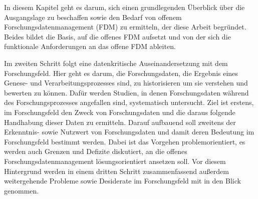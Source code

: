 \onehalfspacing

In diesem Kapitel geht es darum, sich einen grundlegenden Überblick über die Ausgangslage zu beschaffen sowie den Bedarf von offenem Forschungsdatenmanagement (FDM) zu ermitteln, der diese Arbeit begründet. Beides bildet die Basis, auf die offenes FDM aufsetzt und von der sich die funktionale Anforderungen an das offene FDM ableiten. 

Im zweiten Schritt folgt eine datenkritische Auseinandersetzung mit dem Forschungsfeld. Hier geht es darum, die Forschungsdaten, die Ergebnis eines Genese- und Verarbeitungsprozesses sind, zu historisieren um sie verstehen und bewerten zu können. Dafür werden Studien, in denen Forschungsdaten während des Forschungsprozesses angefallen sind, systematisch untersucht. Ziel ist erstens, im Forschungsfeld den Zweck von Forschungsdaten und die daraus folgende Handhabung dieser Daten zu ermitteln. Darauf aufbauend soll zweitens der Erkenntnis- sowie Nutzwert von Forschungsdaten und damit deren Bedeutung im Forschungsfeld bestimmt werden. Dabei ist das Vorgehen problemorientiert, es werden auch Grenzen und Defizite diskutiert, an die offenes Forschungsdatenmanagement lösungsorientiert ansetzen soll. Vor diesem Hintergrund werden in einem dritten Schritt zusammenfassend außerdem weitergehende Probleme sowie Desiderate im Forschungsfeld mit in den Blick genommen.


